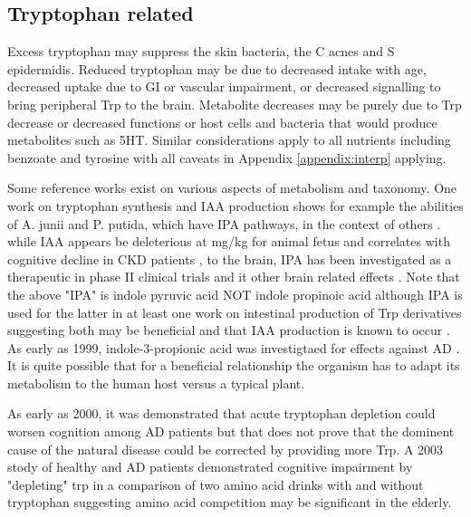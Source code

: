 \documentclass[aps,secnumarabic,balancelastpage,amsmath,amssymb,nofootinbib]{revtex4}
\newcommand{\mjmrefapp}[1]{Appendix   \ref{appendix:#1}}
\begin{document}
\subsection{Tryptophan related}

Excess tryptophan may suppress the skin bacteria,
the C acnes and S epidermidis.
Reduced tryptophan may be due to decreased intake
with age, decreased uptake due to GI or vascular
impairment, or decreased signalling to bring peripheral
Trp to the brain. Metabolite decreases may be purely
due to Trp decrease or decreased functions or
host cells and bacteria that would produce metabolites
such as 5HT. 
Similar considerations apply to all nutrients including benzoate and tyrosine
with all caveats in \mjmrefapp{interp} applying.

Some reference works exist on various aspects of
metabolism and taxonomy. One work on tryptophan
synthesis and IAA production shows for example
the abilities of A. junii and P. putida,
which have IPA pathways,  in the 
context of others
\cite{SuarezPerez_Bacterial_gene_diversity_related_2020}.
while IAA appears be  deleterious at mg/kg for animal 
fetus
\cite{Furukawa_Abe_Usuda_Indole_Acetic_Acid_2004}
\cite{FURUKAWA200743}
and correlates with cognitive decline in CKD patients
\cite{LIN201985},  to the brain,
IPA has been investigated as a therapeutic in phase II
clinical trials \cite{Politi1999} and it other brain
related effects \cite{Moroni1991}\cite{Bartolini2003}.
Note that the above "IPA" is indole pyruvic acid  NOT indole propinoic
acid although IPA is used for the latter in at least one work on intestinal
production of Trp derivatives suggesting both may be beneficial and
that IAA production is known to occur
\cite{PMC8972051}. As early as 1999, indole-3-propionic acid
was investigtaed for effects against AD \cite{Chyan_Poeggeler_Omar_Potent_Neuroprotective_Properties_against_1999}.
It is quite possible that for a beneficial relationship
the organism has to adapt its metabolism to the human host
versus a typical plant.

As early as 2000, it was demonstrated that acute tryptophan
depletion could worsen cognition among AD patients
\cite{Porter_Cognitive_Deficit_Induced_2000} but that does not
prove that the dominent cause of the natural disease could
be corrected by providing more Trp. A 2003 stody of healthy 
and AD patients demonstrated cognitive impairment by
"depleting" trp in a comparison of two amino acid drinks with and
without tryptophan \cite{PORTER_LUNN_OBRIEN_Effects_acute_tryptophan_2003}
suggesting amino acid competition may be significant in the elderly.  
\end{document}
